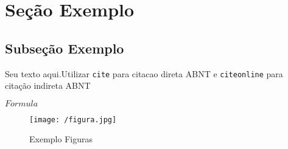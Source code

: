 \documentclass[
	12pt,				%
	a4paper,			%
	english,			%
	brazil				%
	]{article}
\begin{document}
\section{Seção  Exemplo}

\subsection{Subseção Exemplo}
\label{sec:exemp1}

\par Seu texto aqui.Utilizar \texttt{cite} para citacao direta ABNT e \texttt{citeonline} para citação indireta ABNT

\par $Formula$ 

\begin{figure*}[htp]
    \centering
    \caption{Exemplo Figuras}
    \texttt{[image: /figura.jpg]}
    \label{fig:kg}
\end{figure*}



\renewcommand{\refname}{Referencial Bibliográfico}

    
\end{document}
